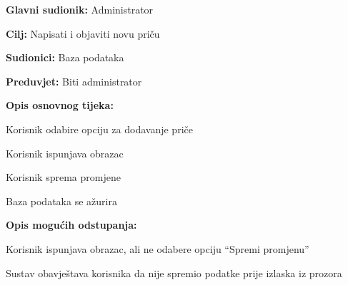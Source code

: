 					\noindent {}
					\begin{packed_item}
						
						\item \textbf{Glavni sudionik: }Administrator
						\item  \textbf{Cilj:} Napisati i objaviti novu priču
						\item  \textbf{Sudionici:} Baza podataka
						\item  \textbf{Preduvjet:} Biti administrator
						\item  \textbf{Opis osnovnog tijeka:}
						
						\item[] \begin{packed_enum}
							
							\item Korisnik odabire opciju za dodavanje priče
							\item Korisnik ispunjava obrazac
							\item Korisnik sprema promjene
							\item Baza podataka se ažurira
						\end{packed_enum}
					
						\item  \textbf{Opis mogućih odstupanja:}
						
						\item[] \begin{packed_item}
							
							\item[2.a] Korisnik ispunjava obrazac, ali ne odabere opciju “Spremi promjenu”
							\item[] \begin{packed_enum}
								
								\item Sustav obavještava korisnika da nije spremio podatke prije izlaska iz prozora
								
							\end{packed_enum}
							
						\end{packed_item}
				
						
					\end{packed_item}
				
